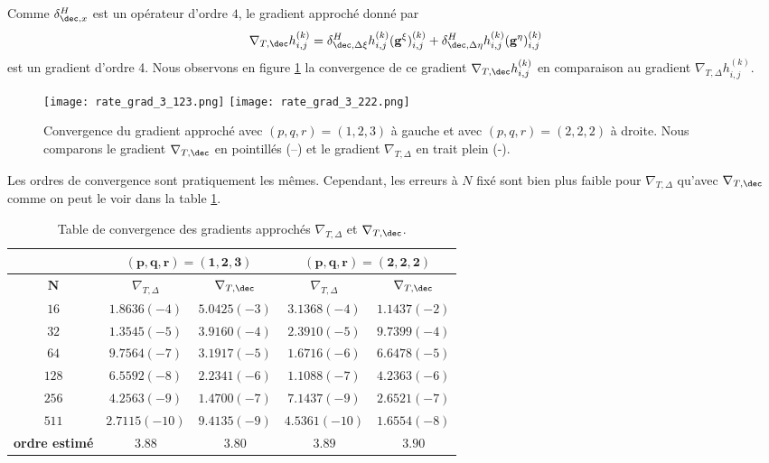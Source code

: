 Comme $\delta^H_{\dec,x}$ est un opérateur d'ordre $4$, le gradient approché donné par 
\begin{equation}
\nabla_{T,\dec} h_{i,j}^{(k)} = \delta^H_{\dec,\Delta \xi} h_{i,j}^{(k)} ( \mathbf{g}^{\xi} )_{i,j}^{(k)} + \delta^H_{\dec,\Delta \eta} h_{i,j}^{(k)} ( \mathbf{g}^{\eta} )_{i,j}^{(k)}
\end{equation}
est un gradient d'ordre 4.
Nous observons en figure \ref{fig:rate_grad3} la convergence de ce gradient $\nabla_{T,\dec} h_{i,j}^{(k)}$ en comparaison au gradient $\nabla_{T,\Delta} h_{i,j}^{(k)}$.
\begin{figure}[htbp]
\begin{center}
\texttt{[image: rate\_grad\_3\_123.png]}
\texttt{[image: rate\_grad\_3\_222.png]}
\end{center}
\caption{Convergence du gradient approché avec $(p,q,r)=(1,2,3)$ à gauche et avec $(p,q,r)=(2,2,2)$ à droite. Nous comparons le gradient $\nabla_{T,\dec}$ en pointillés (--) et le gradient $\nabla_{T,\Delta}$ en trait plein (-).}
\label{fig:rate_grad3}
\end{figure}
Les ordres de convergence sont pratiquement les mêmes. Cependant, les erreurs à $N$ fixé sont bien plus faible pour $\nabla_{T,\Delta}$ qu'avec $\nabla_{T,\dec}$ comme on peut le voir dans la table \ref{tab:rate_grad3}.

\begin{table}[htbp]
\begin{center}
\begin{tabular}{|c||c|c||c|c|}
\hline
  & \multicolumn{2}{c||}{$\mathbf{(p,q,r)=(1,2,3)}$} & \multicolumn{2}{c|}{$\mathbf{(p,q,r)=(2,2,2)}$} \\
\hline
$\mathbf{N}$    &  $\nabla_{T,\Delta}$  & $\nabla_{T,\dec}$  &  $\nabla_{T,\Delta}$  & $\nabla_{T,\dec}$     \\
\hline
\hline
$16$   & $1.8636 (-4)$ & $5.0425 (-3)$ & $3.1368 (-4)$ & $1.1437 (-2)$ \\
$32$   & $1.3545 (-5)$ & $3.9160 (-4)$ & $2.3910 (-5)$ & $9.7399 (-4)$ \\
$64$   & $9.7564 (-7)$ & $3.1917 (-5)$ & $1.6716 (-6)$ & $6.6478 (-5)$ \\
$128$  & $6.5592 (-8)$ & $2.2341 (-6)$ & $1.1088 (-7)$ & $4.2363 (-6)$ \\
$256$  & $4.2563 (-9)$ & $1.4700 (-7)$ & $7.1437 (-9)$ & $2.6521 (-7)$ \\
$511$  & $2.7115(-10)$ & $9.4135 (-9)$ & $4.5361(-10)$ & $1.6554 (-8)$ \\
\hline
\hline
\textbf{ordre estimé} & $3.88$ & $3.80$ & $3.89$ & $3.90$\\
\hline 
\end{tabular}
\end{center}
\caption{Table de convergence des gradients approchés $\nabla_{T,\Delta}$ et $\nabla_{T,\dec}$.}
\label{tab:rate_grad3}
\end{table}














